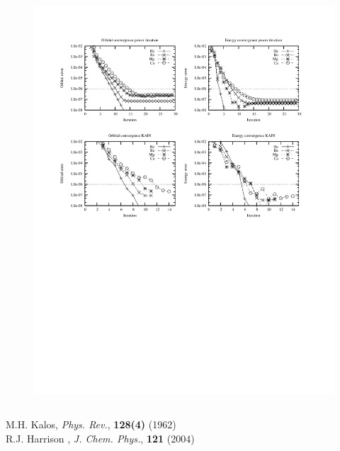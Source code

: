 \begin{frame}
\begin{columns}
\begin{column}[b]{0.5\textwidth}
\begin{figure}
	\includegraphics[scale=0.55, clip, viewport = 301 550 551 715] {figures/accuracy.pdf}
    \end{figure}
    \end{column}
    \end{columns}

    \vspace{2mm}

    \centering
    \tiny
    M.H. Kalos, 
    {\it Phys. Rev.}, 
    \textbf{128(4)}
    (1962)\\
    R.J. Harrison \etal,
    {\it J. Chem. Phys.}, 
    \textbf{121}
    (2004)
\end{frame}


